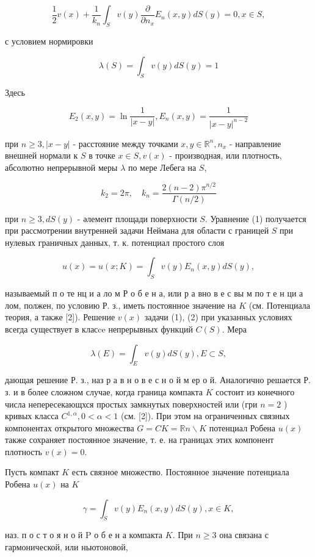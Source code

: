 \documentclass[10pt]{article}
\begin{document}
\[

\frac{1}{2} v(x)+\frac{1}{k_{n}} \int_{S} v(y) \frac{\partial}{\partial n_{x}} E_{n}(x, y) d S(y)=0, x \in S,

\]



с условием нормировки



\[

\lambda(S)=\int_{S} v(y) d S(y)=1

\]



Здесь



\[

E_{2}(x, y)=\ln \frac{1}{|x-y|}, E_{n}(x, y)=\frac{1}{|x-y|^{n-2}}

\]



при $n \geqslant 3,|x-y|$ - расстояние между точками $x, y \in \mathbb{R}^{n}, n_{x}$ - направление внешней нормали к $S$ в точке $x \in S, v(x)$ - производная, или плотность, абсолютно непрерывной меры $\lambda$ по мере Лебега на $S$,



\[

k_{2}=2 \pi, \quad k_{n}=\frac{2(n-2) \pi^{n / 2}}{\Gamma(n / 2)}

\]



при $n \geqslant 3, d S(y)$ - әлемент площади поверхности $S$. Уравнение (1) получается при рассмотрении внутренней задачи Неймана для области с границей $S$ при нулевых граничных данных, т. к. потенциал простого слоя



\[

u(x)=u(x ; K)=\int_{S} v(y) E_{n}(x, y) d S(y),

\]



называемый п о те нц и а ло м Р о б е н а, или р а вно в е с вы м по т е н ци а лом, полжен, по условию Р. з., иметь постоянное значение на $K$ (см. Потенциала теория, а также [2]). Решение $v(x)$ задачи (1), (2) при указанных условиях всегда существует в класce непрерывных функций $C(S)$. Мера



\[

\lambda(E)=\int_{E} v(y) d S(y), E \subset S,

\]



дающая решение Р. з., наз р а в н о в е с н о й м ер о й. Аналогично решается Р. з. и в более сложном случае, когда граница компакта $K$ состоит из конечного числа непересекающхся простых замкнутых поверхностей или (гри $n=2$ ) кривых класса $C^{1, \alpha}, 0<\alpha<1$ (см. [2]). При этом на ограниченных связных компонентах открытого множества $G=C K=\mathbb{R} n \backslash K$ потенциал Робена $u(x)$ также сохраняет постоянное значение, т. е. на границах этих компонент плотность $v(x)=0$.



Пусть компакт $K$ есть связное множество. Постоянное значение потенциала Робена $u(x)$ на $K$



\[

\gamma=\int_{S} v(y) E_{n}(x, y) d S(y), x \in K,

\]



наз. п о с т о я н о й $\mathrm{P}$ о б е н а компакта $K$. При $n \geqslant 3$ она связана с гармонической, или ньютоновой,
\end{document}
